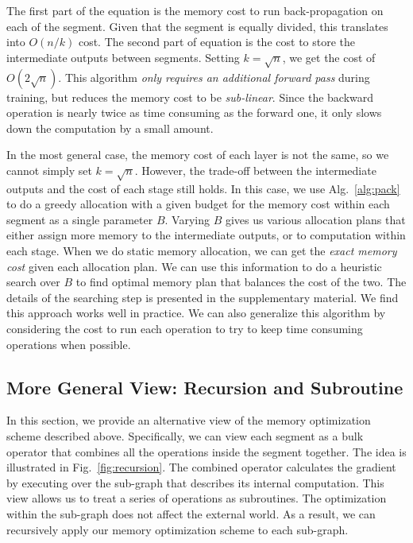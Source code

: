 The first part of the equation is the memory cost to run back-propagation on each of the segment. Given that the segment is equally divided, this translates into $O(n/k)$ cost. The second part of equation is the cost to store the intermediate outputs between segments. Setting $k =\sqrt{n}$, we get the cost of $O( 2 \sqrt{n} )$. This algorithm \emph{only requires an additional forward pass} during training, but reduces the memory cost to be \emph{sub-linear}.
Since the backward operation is nearly twice as time consuming as the forward one, it only slows down the computation by a small amount.

In the most general case, the memory cost of each layer is not the same, so we cannot simply set $k =\sqrt{n}$. However, the trade-off between the intermediate outputs and the cost of each stage still holds.  In this case, we use Alg.~\ref{alg:pack} to do a greedy allocation with a given budget for the memory cost within each segment as a single parameter $B$. Varying $B$ gives us various allocation plans that either assign more memory to the intermediate outputs, or to computation within each stage. When we do static memory allocation, we can get the \emph{exact memory cost} given each allocation plan. We can use this information to do a heuristic search over $B$ to find optimal memory plan that balances the cost of the two. The details of the searching step is presented in the supplementary material. We find this approach works well in practice. We can also generalize this algorithm by considering the cost to run each operation to try to keep time consuming operations when possible.

\subsection{More General View: Recursion and Subroutine}
\label{sec:recursion}

In this section, we provide an alternative view of the memory optimization scheme described above. Specifically, we can view each segment as a bulk operator that combines all the operations inside the segment together. The idea is illustrated in Fig.~\ref{fig:recursion}.
The combined operator calculates the gradient by executing over the sub-graph that describes its internal computation. This view allows us to treat a series of operations as subroutines. The optimization within the sub-graph does not affect the external world. As a result, we can recursively apply our memory optimization scheme to each sub-graph.

